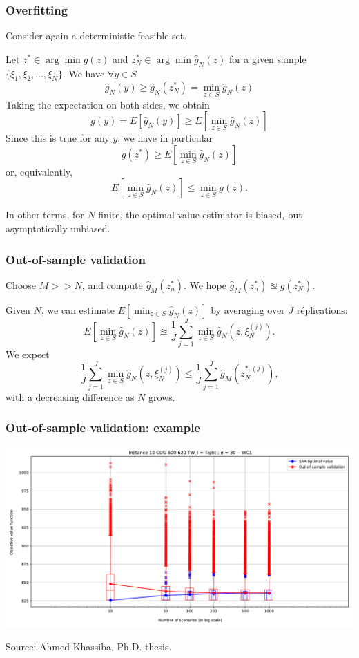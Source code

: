 \documentclass{beamer}
\begin{document}
\begin{frame}
\frametitle{Overfitting}

Consider again a deterministic feasible set.

\mbox{}

Let $z^* \in \arg\min g(z)$ and $z^*_N  \in \arg\min \hat{g}_N (z)$  for a given sample $\lbrace \xi_1, \xi_2, \ldots, \xi_N \rbrace$. We have $\forall y \in S$
$$
\hat{g}_N(y) \geq \hat{g}_N(z^*_N) = \min_{z \in S} \hat{g}_N(z)
$$
Taking the expectation on both sides, we obtain
$$
g(y) = E[\hat{g}_N(y)] \geq  E\left[ \min_{z \in S} \hat{g}_N(z) \right]
$$
Since this is true for any $y$, we have in particular
$$
g(z^*) \geq E\left[ \min_{z \in S} \hat{g}_N(z) \right]
$$
or, equivalently,
$$
E\left[ \min_{z \in S} \hat{g}_N(z) \right] \leq \min_{z \in S} g(z).
$$

\mbox{}

In other terms, for $N$ finite, the optimal value estimator is biased, but asymptotically unbiased.

\end{frame}

\begin{frame}
\frametitle{Out-of-sample validation}

Choose $M >> N$, and compute $\hat{g}_M(z_n^*)$. We hope $\hat{g}_M(z_n^*) \approxeq g(z_N^*)$.

\mbox{}

Given $N$, we can estimate $E[\min_{z \in S} \hat{g}_N(z)]$ by averaging over $J$ réplications:
$$
E\left[\min_{z \in S} \hat{g}_N(z)\right] \approxeq \frac{1}{J} \sum_{j = 1}^J \min_{z \in S} \hat{g}_N\left(z, \xi_N^{(j)}\right).
$$
We expect
$$
\frac{1}{J} \sum_{j = 1}^J \min_{z \in S} \hat{g}_N\left(z, \xi_N^{(j)}\right) \leq 
\frac{1}{J} \sum_{j = 1}^J \hat{g}_M\left(z_N^{*,(j)}\right),
$$
with a decreasing difference as $N$ grows.

\end{frame}

\begin{frame}
\frametitle{Out-of-sample validation: example}

\begin{center}
\includegraphics[width=\textwidth]{imgs/instance_landing.pdf}
\end{center}
Source: Ahmed Khassiba, Ph.D. thesis.

\end{frame}
\end{document}
